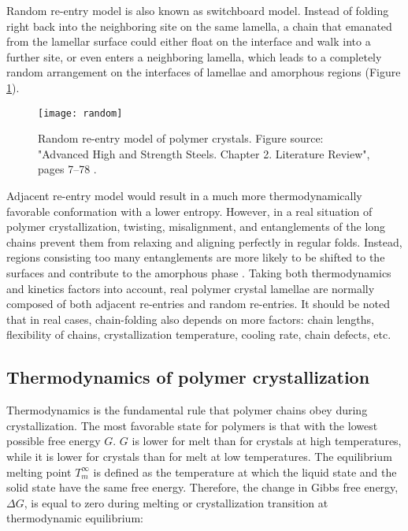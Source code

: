 Random re-entry model is also known as switchboard model. Instead of folding right back into the neighboring site on the same lamella, a chain that emanated from the lamellar surface could either float on the interface and walk into a further site, or even enters a neighboring lamella, which leads to a completely random arrangement on the interfaces of lamellae and amorphous regions (Figure \ref{fig:random}).

\begin{figure}[H]
\center
\vspace{1 cm}
\texttt{[image: random]}
\caption[Random re-entry model of polymer crystals.]{Random re-entry model of polymer crystals. Figure source: "Advanced High and Strength Steels. Chapter 2. Literature Review", pages 7–78 \cite{High}.}
\label{fig:random}
\end{figure}

Adjacent re-entry model would result in a much more thermodynamically favorable conformation with a lower entropy. However, in a real situation of polymer crystallization, twisting, misalignment, and entanglements of the long chains prevent them from relaxing and aligning perfectly in regular folds. Instead, regions consisting too many entanglements are more likely to be shifted to the surfaces and contribute to the amorphous phase \cite{Strobl2007}. Taking both thermodynamics and kinetics factors into account, real polymer crystal lamellae are normally composed of both adjacent re-entries and random re-entries. It should be noted that in real cases, chain-folding also depends on more factors: chain lengths, flexibility of chains, crystallization temperature, cooling rate, chain defects, etc.
 
\subsection{Thermodynamics of polymer crystallization} \label{Thermodynamics of polymer crystallization}

Thermodynamics is the fundamental rule that polymer chains obey during crystallization. The most favorable state for polymers is that with the lowest possible free energy $G$. $G$ is lower for melt than for crystals at high temperatures, while it is lower for crystals than for melt at low temperatures. The equilibrium melting point $T_{m}^{\infty}$ is defined as the temperature at which the liquid state and the solid state have the same free energy. Therefore, the change in Gibbs free energy, $\Delta G$, is equal to zero during melting or crystallization transition at thermodynamic equilibrium:

